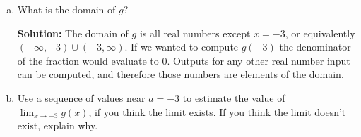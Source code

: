 \begin{enumerate}[(a)] %

\item What is the domain of $g$?

{\bf Solution:}  The domain of $g$ is all real numbers except $x = -3$, or equivalently $(-\infty, -3) \cup (-3, \infty)$.  If we wanted to compute $g(-3)$ the denominator of the fraction would evaluate to 0.  Outputs for any other real number input can be computed, and therefore those numbers are elements of the domain.

\bigskip

\item Use a sequence of values near $a = -3$ to estimate the value of $\lim_{x \rightarrow -3} g(x)$, if you think the limit exists.  If you think the limit doesn't exist, explain why.


\end{enumerate}
